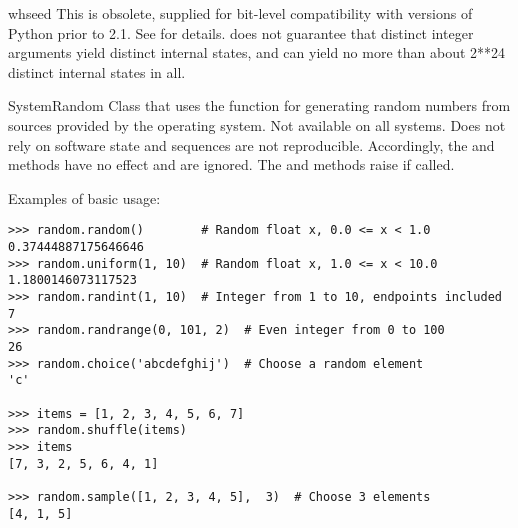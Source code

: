 \begin{funcdesc}{whseed}{}
  This is obsolete, supplied for bit-level compatibility with versions
  of Python prior to 2.1.
  See  for details.   does not guarantee
  that distinct integer arguments yield distinct internal states, and can
  yield no more than about 2**24 distinct internal states in all.
\end{funcdesc}

\begin{classdesc}{SystemRandom}{}
Class that uses the  function for generating
random numbers from sources provided by the operating system.
Not available on all systems.
Does not rely on software state and sequences are not reproducible.
Accordingly, the  and  methods
have no effect and are ignored.  The  and
 methods raise  if
called.
\end{classdesc}

Examples of basic usage:

\begin{verbatim}
>>> random.random()        # Random float x, 0.0 <= x < 1.0
0.37444887175646646
>>> random.uniform(1, 10)  # Random float x, 1.0 <= x < 10.0
1.1800146073117523
>>> random.randint(1, 10)  # Integer from 1 to 10, endpoints included
7
>>> random.randrange(0, 101, 2)  # Even integer from 0 to 100
26
>>> random.choice('abcdefghij')  # Choose a random element
'c'

>>> items = [1, 2, 3, 4, 5, 6, 7]
>>> random.shuffle(items)
>>> items
[7, 3, 2, 5, 6, 4, 1]

>>> random.sample([1, 2, 3, 4, 5],  3)  # Choose 3 elements
[4, 1, 5]

\end{verbatim}

\begin{seealso}


\end{seealso}

